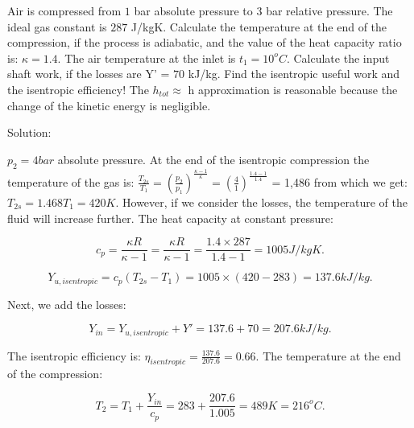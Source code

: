 \vspace{1cm}
\begin{tcolorbox}

Air is compressed from $1$ bar absolute pressure to $3$ bar relative pressure. The ideal gas constant is $287$ J/kgK. Calculate the temperature at the end of the compression, if the process is adiabatic, and the value of the heat capacity ratio is: $\kappa=1.4$. The air temperature at the inlet is $t_1 = 10^oC$. Calculate the input shaft work, if the losses are Y’ = $70$ kJ/kg. Find the isentropic useful work and the isentropic efficiency! The $h_{tot}\approx$ h approximation is reasonable because the change of the kinetic energy is negligible.
\vspace{0.2cm}

Solution:
\vspace{0.2cm}

$p_2=4 bar$ absolute pressure. At the end of the isentropic compression the temperature of the gas is: 
$\frac{T_{2s}}{T_1}=\left(\frac{p_2}{p_1}\right)^{\frac{\kappa-1}{\kappa}}=\left(\frac{4}{1}\right)^{\frac{1.4-1}{1.4}}$ = 1,486 from which we get: $T_{2s}=1.468T_1=420 K$. However, if we consider the losses, the temperature of the fluid will increase further.
The heat capacity at constant pressure:

\begin{equation*}
c_p=\frac{\kappa R}{\kappa-1}=\frac{\kappa R}{\kappa-1}=\frac{1.4\times287}{1.4-1}=1005 J/kgK.
\end{equation*}

\begin{equation*}
Y_{u,isentropic}=c_p(T_{2s}-T_1)=1005\times(420-283)=137.6 kJ/kg.
\end{equation*}
\vspace{0.1cm}

Next, we add the losses:

\begin{equation*}
Y_{in}=Y_{u,isentropic}+Y'=137.6 + 70 = 207.6 kJ/kg.
\end{equation*}
\vspace{0.1cm}

The isentropic efficiency is: $\eta_{isentropic}=\frac{137.6}{207.6}=0.66$. The temperature at the end of the compression:

\begin{equation*}
T_2=T_1+\frac{Y_{in}}{c_p}=283+\frac{207.6}{1.005}=489 K = 216^oC.
\end{equation*}

\end{tcolorbox}

